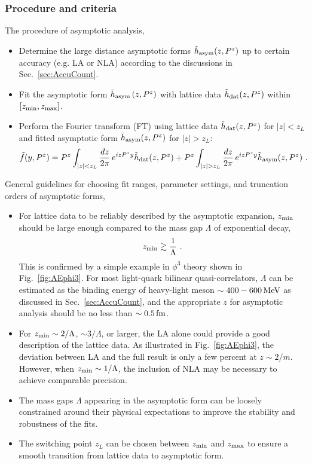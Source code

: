 \documentclass[a4paper,11pt]{article}
\begin{document}
\subsubsection{Procedure and criteria}\label{sec:fitcriteria}
The procedure of asymptotic analysis, 
\begin{itemize}
    \item Determine the large distance asymptotic forms $\tilde{h}_{\rm asym}(z,P^z)$ up to certain accuracy (e.g. LA or NLA) according to the discussions in Sec.~\ref{sec:AccuCount}.
    \item Fit the asymptotic form $\tilde{h}_{\rm asym}\left(z,P^z\right)$ with lattice data $\tilde{h}_{\rm dat}(z,P^z)$ within $[z_{\rm min}, z_{\rm max}]$. 
    \item Perform the Fourier transform (FT) using lattice data $\tilde{h}_{\rm dat}(z,P^z)$ for $|z|<z_L$ and fitted asymptotic form $\tilde{h}_{\rm asym}(z,P^z)$ for $|z|>z_L$:
    \begin{align}\label{eq:FT}
    \tilde{f}(y,P^z) = P^z \int_{|z|<z_L} \frac{d z}{2\pi} \, e^{i z P^z y} \tilde{h}_{\rm dat}(z,P^z) + P^z \int_{|z|>z_L} \frac{d z}{2\pi} \, e^{i z P^z y} \tilde{h}_{\rm asym}(z,P^z) \ . 
    \end{align}
\end{itemize}
General guidelines for choosing fit ranges, parameter settings, and truncation orders of asymptotic forms,
\begin{itemize}
\item For lattice data to be reliably described by the asymptotic expansion, $z_{\rm min}$ should be large enough compared to the mass gap $\Lambda$ of exponential decay,
\begin{align}
 z_{\rm min}  \gtrsim \frac{1}{\Lambda} \ .
\end{align}
This is confirmed by a simple example in $\phi^3$ theory shown in Fig.~\ref{fig:AEphi3}. For most light-quark bilinear quasi-correlators, $\Lambda$ can be estimated as the binding energy of heavy-light meson $\sim 400-600 \, {\rm MeV}$ as discussed in Sec.~\ref{sec:AccuCount}, and the appropriate $z$ for asymptotic analysis should be no less than $\sim 0.5 \, {\rm fm}$. 

\item For $z_{\rm min} \sim 2/\Lambda$, $\sim 3/\Lambda$, or larger, the LA alone could provide a good description of the lattice data. As illustrated in Fig.~\ref{fig:AEphi3}, the deviation between LA and the full result is only a few percent at $z\sim 2/m$. However, when $z_{\rm min} \sim 1/\Lambda$, the inclusion of NLA may be necessary to achieve comparable precision.

\item The mass gaps $\Lambda$ appearing in the asymptotic form can be loosely constrained around their physical expectations to improve the stability and robustness of the fits.

\item The switching point $z_L$ can be chosen between $z_{\rm min}$ and $z_{\rm max}$ to ensure a smooth transition from lattice data to asymptotic form. 
\end{itemize}
\end{document}
